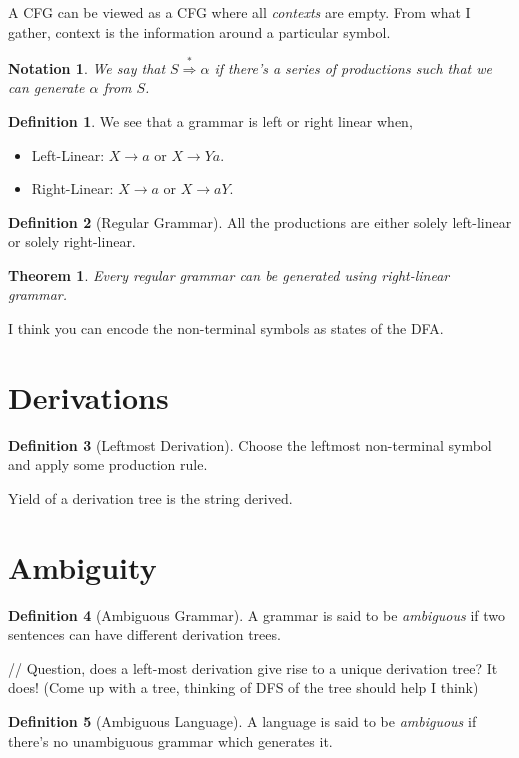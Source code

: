 \documentclass[a4paper]{scrartcl}
\newtheorem{theorem}{Theorem}
\newtheorem*{notation}{Notation}
\theoremstyle{definition}
\newtheorem{definition}{Definition}
\begin{document}
A CFG can be viewed as a CFG where all \emph{contexts} are empty. From what I gather, context is the information around a particular symbol.

\begin{notation}
	We say that $S \stackrel{*}{\Rightarrow} \alpha$ if there's a series of productions such that we can generate $\alpha$ from $S$.
\end{notation}

\begin{definition}
	We see that a grammar is left or right linear when,
	\begin{itemize}
		\item Left-Linear: $X \to a$ or $X \to Y a$.
		\item Right-Linear: $X \to a$ or $X \to a Y$.
	\end{itemize}
\end{definition}

\begin{definition}[Regular Grammar]
	All the productions are either solely left-linear or solely right-linear.
\end{definition}
\begin{theorem}
	Every regular grammar can be generated using right-linear grammar.
\end{theorem}
I think you can encode the non-terminal symbols as states of the DFA.

\section{Derivations}
\begin{definition}[Leftmost Derivation]
	Choose the leftmost non-terminal symbol and apply some production rule.
\end{definition}

Yield of a derivation tree is the string derived.

\section{Ambiguity}
\begin{definition}[Ambiguous Grammar]
	A grammar is said to be \emph{ambiguous} if two sentences can have different derivation trees.
\end{definition}
// Question, does a left-most derivation give rise to a unique derivation tree? It does! (Come up with a tree, thinking of DFS of the tree should help I think)

\begin{definition}[Ambiguous Language]
	A language is said to be \emph{ambiguous} if there's no unambiguous grammar which generates it.
\end{definition}
\end{document}
